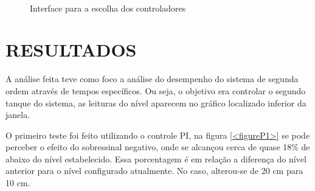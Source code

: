 \documentclass[a4paper,12pt]{article}
\begin{document}
\begin{figure}[H]
     \centering
     \hspace{4ex}
     \\
     \caption{Interface para a escolha dos controladores}
     \label{fig:controladores}
\end{figure}


\newpage


\thispagestyle{main}

\section{RESULTADOS}

\hspace{4ex}A análise feita teve como foco a análise do desempenho do sistema de segunda ordem através de tempos específicos. Ou seja, o objetivo era controlar o segundo tanque do sistema, as leituras do nível aparecem no gráfico localizado inferior da janela.

\hspace{4ex}O primeiro teste foi feito utilizando o controle PI, na figura \ref{<figureP1>} se pode perceber o efeito do sobressinal negativo, onde se alcançou cerca de quase 18\% de  abaixo do nível estabelecido. Essa porcentagem é em relação a diferença do nível anterior para o nível configurado atualmente. No caso, alterou-se de 20 cm para 10 cm.
\end{document}
